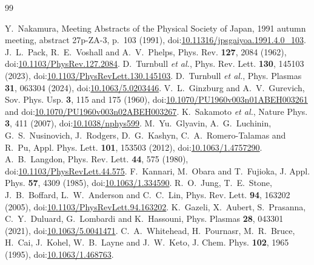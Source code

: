 \begin{thebibliography}{99}
\raggedright
{} Y.~Nakamura, Meeting Abstracts of the Physical Society of Japan,
1991 autumn meeting, abstract 27p-ZA-3, p.~103 (1991),
doi:\href{https://doi.org/10.11316/jpsgaiyoa.1991.4.0_103}{10.11316/jpsgaiyoa.1991.4.0\_103}.
 J.~L.~Pack, R.~E.~Voshall and A.~V.~Phelps, Phys. Rev. \textbf{127},
2084 (1962), doi:\href{https://doi.org/10.1103/PhysRev.127.2084}{10.1103/PhysRev.127.2084}.
 D.~Turnbull \emph{et al.}, Phys. Rev. Lett. \textbf{130}, 145103
(2023), doi:\href{https://doi.org/10.1103/PhysRevLett.130.145103}{10.1103/PhysRevLett.130.145103}.
 D.~Turnbull \emph{et al.}, Phys. Plasmas \textbf{31}, 063304 (2024),
doi:\href{https://doi.org/10.1063/5.0203446}{10.1063/5.0203446}.
 V.~L.~Ginzburg and A.~V.~Gurevich, Sov. Phys. Usp.
\textbf{3}, 115 and 175 (1960),
doi:\href{https://doi.org/10.1070/PU1960v003n01ABEH003261}{10.1070/PU1960v003n01ABEH003261} and
doi:\href{https://doi.org/10.1070/PU1960v003n02ABEH003267}{10.1070/PU1960v003n02ABEH003267}.
 K.~Sakamoto \emph{et al.}, Nature Phys. \textbf{3}, 411 (2007),
doi:\href{https://doi.org/10.1038/nphys599}{10.1038/nphys599}.
 M.~Yu.~Glyavin, A.~G.~Luchinin, G.~S.~Nusinovich, J.~Rodgers,
D.~G.~Kashyn, C.~A.~Romero-Talamas and R.~Pu, Appl. Phys. Lett. \textbf{101}, 153503 (2012),
doi:\href{https://doi.org/10.1063/1.4757290}{10.1063/1.4757290}.
 A.~B.~Langdon, Phys. Rev. Lett. \textbf{44}, 575 (1980),
doi:\href{https://doi.org/10.1103/PhysRevLett.44.575}{10.1103/PhysRevLett.44.575}.
 F.~Kannari, M.~Obara and T.~Fujioka, J. Appl. Phys. \textbf{57},
4309 (1985), doi:\href{https://doi.org/10.1063/1.334590}{10.1063/1.334590}.
 R.~O.~Jung, T.~E.~Stone, J.~B.~Boffard, L.~W.~Anderson and C.~C.~Lin,
Phys. Rev. Lett. \textbf{94}, 163202 (2005),
doi:\href{https://doi.org/10.1103/PhysRevLett.94.163202}{10.1103/PhysRevLett.94.163202}.
 K.~Gazeli, X.~Aubert, S.~Prasanna, C.~Y.~Duluard, G.~Lombardi and
K.~Hassouni, Phys. Plasmas \textbf{28}, 043301 (2021),
doi:\href{https://doi.org/10.1063/5.0041471}{10.1063/5.0041471}.
 C.~A.~Whitehead, H.~Pournasr, M.~R.~Bruce, H.~Cai, J.~Kohel,
W.~B.~Layne and J.~W.~Keto, J. Chem. Phys. \textbf{102}, 1965 (1995),
doi:\href{https://doi.org/10.1063/1.468763}{10.1063/1.468763}.
\end{thebibliography}

